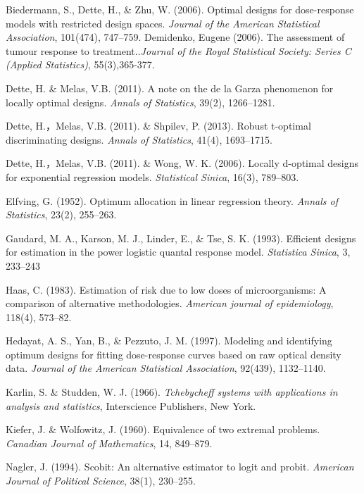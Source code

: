 \documentclass[12pt]{TD-CJS}
\begin{document}
\begin{thebibliography}{}
Biedermann, S., Dette, H., \& Zhu, W. (2006). Optimal designs for dose-response models with restricted design spaces. {\it Journal of the American Statistical Association}, 101(474), 747--759.
Demidenko, Eugene (2006). The assessment of tumour response to treatment..{\it Journal of the Royal Statistical Society: Series C (Applied Statistics)}, 55(3),365-377.

Dette, H. \& Melas, V.B. (2011). A note on the de la Garza phenomenon for locally optimal designs. {\it Annals of Statistics}, 39(2), 1266--1281.

Dette, H.，Melas, V.B. (2011). \& Shpilev, P. (2013). Robust t-optimal discriminating designs. {\it Annals of Statistics}, 41(4), 1693--1715.

Dette, H.，Melas, V.B. (2011). \& Wong, W. K. (2006). Locally d-optimal designs for exponential regression models. {\it Statistical Sinica}, 16(3), 789--803.

Elfving, G. (1952). Optimum allocation in linear regression theory. {\it Annals of Statistics}, 23(2), 255--263.

Gaudard, M. A., Karson, M. J., Linder, E., \& Tse, S. K. (1993). Efficient designs for estimation in the power logistic quantal response model. {\it Statistica Sinica}, 3, 233--243


Haas, C. (1983). Estimation of risk due to low doses of microorganisms: A comparison of alternative methodologies. {\it American journal of epidemiology}, 118(4), 573--82.

Hedayat, A. S., Yan, B., \& Pezzuto, J. M. (1997). Modeling and identifying optimum designs for fitting dose-response curves based on raw optical density data. {\it Journal of the American Statistical Association}, 92(439), 1132–1140.

Karlin, S. \& Studden, W. J. (1966).  {\it Tchebycheff systems with applications in analysis and statistics}, Interscience Publishers, New York.

Kiefer, J. \& Wolfowitz, J. (1960). Equivalence of two extremal problems. {\it Canadian Journal of Mathematics}, 14, 849--879.

Nagler, J. (1994). Scobit: An alternative estimator to logit and probit. {\it American Journal of Political Science}, 38(1), 230–255.


\end{thebibliography}
\end{document}
